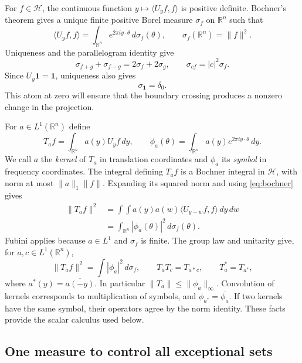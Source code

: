 \documentclass[a4paper,12pt,reqno]{amsart}
\theoremstyle{remark}
\numberwithin{equation}{section}
\newcommand{\R}{\mathbb R}
\newcommand{\Hh}{\mathcal H}
\newcommand{\one}{\mathbf 1}
\begin{document}
For $f\in\Hh$, the continuous function
$y\mapsto\langle U_yf,f\rangle$ is positive definite. Bochner's theorem
\cite[Section~1.4.3, p.~19]{Rudin} gives a unique finite positive
Borel measure $\sigma_f$ on $\R^n$ such that
\begin{equation}\label{eq:bochner}
 \langle U_yf,f\rangle
 =\int_{\R^n}e^{2\pi iy\cdot\theta}\,d\sigma_f(\theta),
 \qquad \sigma_f(\R^n)=\|f\|^2.
\end{equation}
Uniqueness and the parallelogram identity give
\begin{equation}\label{eq:spectral-parallelogram}
 \sigma_{f+g}+\sigma_{f-g}=2\sigma_f+2\sigma_g,
 \qquad \sigma_{cf}=|c|^2\sigma_f.
\end{equation}
Since $U_y\one=\one$, uniqueness also gives
\begin{equation}\label{eq:constant-spectrum}
 \sigma_{\one}=\delta_0.
\end{equation}
This atom at zero will ensure that the boundary crossing produces a
nonzero change in the projection.

For $a\in L^1(\R^n)$ define
\[
 T_af=\int_{\R^n}a(y)U_yf\,dy,\qquad
 \phi_a(\theta)=\int_{\R^n}a(y)e^{2\pi iy\cdot\theta}\,dy.
\]
We call $a$ the \emph{kernel} of $T_a$ in translation coordinates and
$\phi_a$ its \emph{symbol} in frequency coordinates. The integral defining
$T_af$ is a Bochner integral in $\Hh$, with norm at most
$\|a\|_1\|f\|$. Expanding its squared norm and using
\eqref{eq:bochner} gives
\begin{align*}
 \|T_af\|^2
 &=\int\!\!\int a(y)\overline{a(w)}
       \langle U_{y-w}f,f\rangle\,dy\,dw\\
 &=\int_{\R^n}|\phi_a(\theta)|^2\,d\sigma_f(\theta).
\end{align*}
Fubini applies because $a\in L^1$ and $\sigma_f$ is finite.
The group law and unitarity give, for $a,c\in L^1(\R^n)$,
\begin{equation}\label{eq:multiplier-norm}
 \|T_af\|^2=\int|\phi_a|^2\,d\sigma_f,\qquad
 T_aT_c=T_{a*c},\qquad T_a^*=T_{a^*},
\end{equation}
where $a^*(y)=\overline{a(-y)}$. In particular
$\|T_a\|\leq\|\phi_a\|_\infty$. Convolution of kernels corresponds
to multiplication of symbols, and $\phi_{a^*}=\overline{\phi_a}$.
If two kernels have the same symbol, their operators agree by the
norm identity. These facts provide the scalar calculus used below.

\subsection{One measure to control all exceptional sets}
\end{document}
